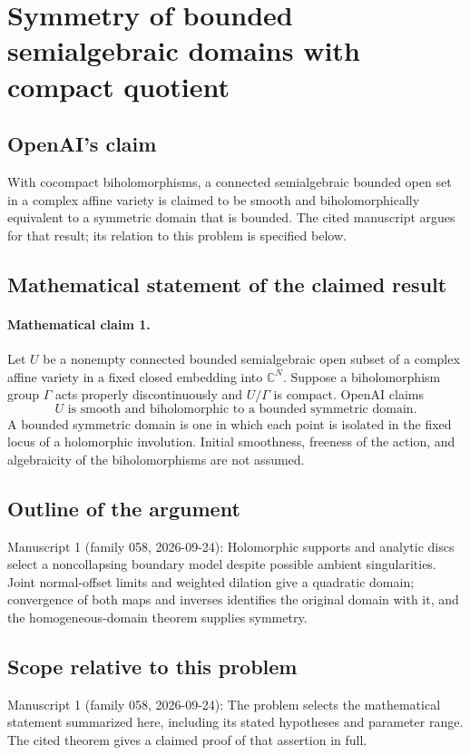 \documentclass[11pt]{article}
\begin{document}
\section*{Symmetry of bounded semialgebraic domains with compact quotient}

\subsection{OpenAI's claim}
With cocompact biholomorphisms, a connected semialgebraic bounded open set in a complex affine variety is claimed to be smooth and biholomorphically equivalent to a symmetric domain that is bounded. The cited manuscript argues for that result; its relation to this problem is specified below.

\subsection{Mathematical statement of the claimed result}
\paragraph{Mathematical claim 1.} Let $U$ be a nonempty connected bounded semialgebraic open subset of a complex affine variety in a fixed closed embedding into $\mathbb C^N$. Suppose a biholomorphism group $\Gamma$ acts properly discontinuously and $U/\Gamma$ is compact. OpenAI claims
\[
U\text{ is smooth and biholomorphic to a bounded symmetric domain}.
\]
A bounded symmetric domain is one in which each point is isolated in the fixed locus of a holomorphic involution. Initial smoothness, freeness of the action, and algebraicity of the biholomorphisms are not assumed.

\subsection{Outline of the argument}
Manuscript 1 (family 058, 2026-09-24): Holomorphic supports and analytic discs select a noncollapsing boundary model despite possible ambient singularities. Joint normal-offset limits and weighted dilation give a quadratic domain; convergence of both maps and inverses identifies the original domain with it, and the homogeneous-domain theorem supplies symmetry.

\subsection{Scope relative to this problem}
Manuscript 1 (family 058, 2026-09-24): The problem selects the mathematical statement summarized here, including its stated hypotheses and parameter range. The cited theorem gives a claimed proof of that assertion in full.
\end{document}
